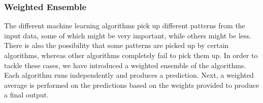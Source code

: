 \subsubsection{Weighted Ensemble}

The different machine learning algorithms pick up different patterns from the input data, some of which might be very important, while others might be 
less. There is also the possibility that some patterns are picked up by certain algorithms, whereas other algorithms completely fail to pick them up.
In order to tackle these cases, we have introduced a weighted ensemble of the algorithms. Each algorithm runs independently and produces a prediction.
Next, a weighted average is performed on the predictions based on the weights provided to produce a final output.

